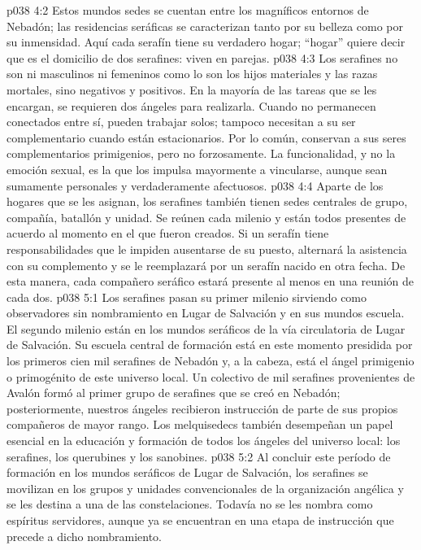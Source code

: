 \vs p038 4:2 Estos mundos sedes se cuentan entre los magníficos entornos de Nebadón; las residencias seráficas se caracterizan tanto por su belleza como por su inmensidad. Aquí cada serafín tiene su verdadero hogar; “hogar” quiere decir que es el domicilio de dos serafines: viven en parejas.
\vs p038 4:3 \pc Los serafines no son ni masculinos ni femeninos como lo son los hijos materiales y las razas mortales, sino negativos y positivos. En la mayoría de las tareas que se les encargan, se requieren dos ángeles para realizarla. Cuando no permanecen conectados entre sí, pueden trabajar solos; tampoco necesitan a su ser complementario cuando están estacionarios. Por lo común, conservan a sus seres complementarios primigenios, pero no forzosamente. La funcionalidad, y no la emoción sexual, es la que los impulsa mayormente a vincularse, aunque sean sumamente personales y verdaderamente afectuosos.
\vs p038 4:4 Aparte de los hogares que se les asignan, los serafines también tienen sedes centrales de grupo, compañía, batallón y unidad. Se reúnen cada milenio y están todos presentes de acuerdo al momento en el que fueron creados. Si un serafín tiene responsabilidades que le impiden ausentarse de su puesto, alternará la asistencia con su complemento y se le reemplazará por un serafín nacido en otra fecha. De esta manera, cada compañero seráfico estará presente al menos en una reunión de cada dos.
\vs p038 5:1 Los serafines pasan su primer milenio sirviendo como observadores sin nombramiento en Lugar de Salvación y en sus mundos escuela. El segundo milenio están en los mundos seráficos de la vía circulatoria de Lugar de Salvación. Su escuela central de formación está en este momento presidida por los primeros cien mil serafines de Nebadón y, a la cabeza, está el ángel primigenio o primogénito de este universo local. Un colectivo de mil serafines provenientes de Avalón formó al primer grupo de serafines que se creó en Nebadón; posteriormente, nuestros ángeles recibieron instrucción de parte de sus propios compañeros de mayor rango. Los melquisedecs también desempeñan un papel esencial en la educación y formación de todos los ángeles del universo local: los serafines, los querubines y los sanobines.
\vs p038 5:2 Al concluir este período de formación en los mundos seráficos de Lugar de Salvación, los serafines se movilizan en los grupos y unidades convencionales de la organización angélica y se les destina a una de las constelaciones. Todavía no se les nombra como espíritus servidores, aunque ya se encuentran en una etapa de instrucción que precede a dicho nombramiento.
